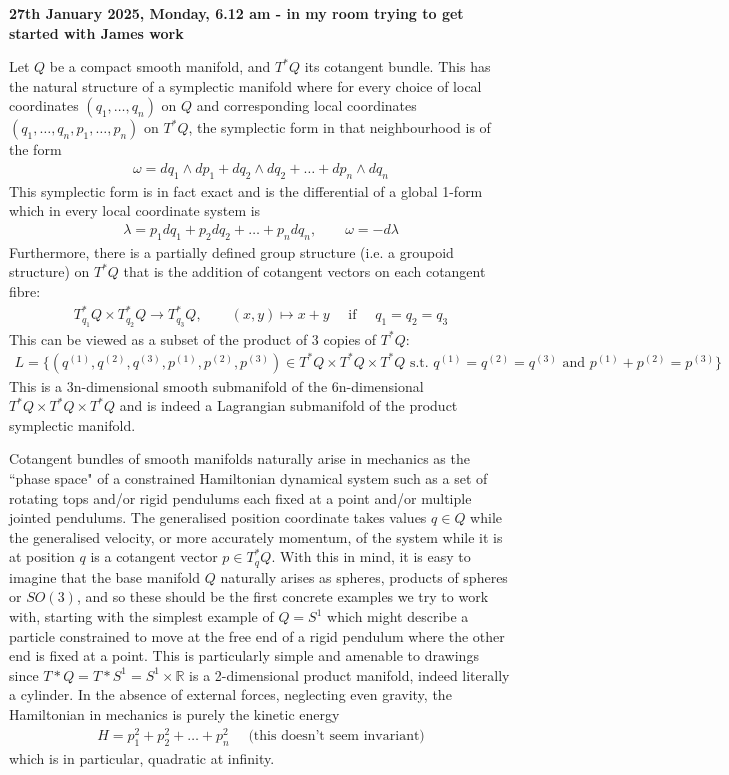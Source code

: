 \documentclass[hidelinks, 12pt]{article}
\theoremstyle{mydefstyle}
\theoremstyle{mythmstyle}
\begin{document}
\textbf{27th January 2025, Monday, 6.12 am - in my room trying to get started with James work}

Let $Q$ be a compact smooth manifold, and $T^*Q$ its cotangent bundle. This has the natural structure of a symplectic manifold where for every choice of local coordinates $(q_1, \dots, q_n)$ on $Q$ and corresponding local coordinates $(q_1, \dots, q_n, p_1, \dots, p_n)$ on $T^*Q$, the symplectic form in that neighbourhood is of the form
\begin{gather*}
\omega = dq_1 \wedge dp_1 + dq_2 \wedge dq_2 + \dots + dp_n \wedge dq_n
\end{gather*}
This symplectic form is in fact exact and is the differential of a global 1-form which in every local coordinate system is
\begin{gather*}
\lambda = p_1 dq_1 + p_2 dq_2 + \dots + p_n dq_n, \qquad \omega = -d\lambda
\end{gather*}
Furthermore, there is a partially defined group structure (i.e. a groupoid structure) on $T^*Q$ that is the addition of cotangent vectors on each cotangent fibre:
\begin{gather*}
T_{q_1}^*Q \times T_{q_2}^*Q \to T_{q_3}^*Q, \qquad (x, y) \mapsto x + y \quad\mbox{ if }\quad q_1 = q_2 = q_3
\end{gather*}
This can be viewed as a subset of the product of 3 copies of $T^*Q$:
\begin{gather*}
L = 
\{
(q^{(1)}, q^{(2)}, q^{(3)}, p^{(1)}, p^{(2)}, p^{(3)}) \in T^*Q \times T^*Q \times T^*Q \mbox{ s.t. } q^{(1)} = q^{(2)} = q^{(3)} \mbox{ and } p^{(1)} + p^{(2)} = p^{(3)}
\}
\end{gather*}
This is a 3n-dimensional smooth submanifold of the 6n-dimensional $T^*Q \times T^*Q \times T^*Q$ and is indeed a Lagrangian submanifold of the product symplectic manifold. 

Cotangent bundles of smooth manifolds naturally arise in mechanics as the ``phase space" of a constrained Hamiltonian dynamical system such as a set of rotating tops and/or rigid pendulums each fixed at a point and/or multiple jointed pendulums. The generalised position coordinate takes values $q \in Q$ while the generalised velocity, or more accurately momentum, of the system while it is at position $q$ is a cotangent vector $p \in T_q^*Q$. With this in mind, it is easy to imagine that the base manifold $Q$ naturally arises as spheres, products of spheres or $SO(3)$, and so these should be the first concrete examples we try to work with, starting with the simplest example of $Q = S^1$ which might describe a particle constrained to move at the free end of a rigid pendulum where the other end is fixed at a point. This is particularly simple and amenable to drawings since $T*Q = T*S^1 = S^1 \times \mathbb{R}$ is a 2-dimensional product manifold, indeed literally a cylinder. In the absence of external forces, neglecting even gravity, the Hamiltonian in mechanics is purely the kinetic energy
\begin{gather*}
H = p_1^2 + p_2^2 + \dots + p_n^2 \quad\mbox{ (this doesn't seem invariant)}
\end{gather*}
which is in particular, quadratic at infinity. 
\end{document}
